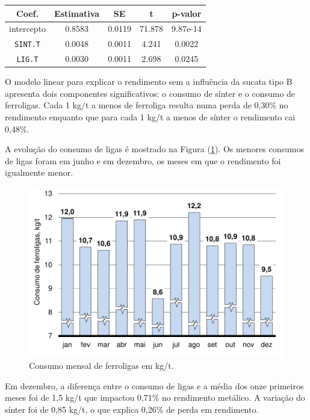 \begin{multicols}{2}
\begin{table}[H]
\begin{center}
\begin{small}
		\label{tab:newmod}
			\begin{tabular}{ccccc}
				\hline
				Coef. & Estimativa & SE & t & p-valor \\
				\hline \hline
				intercepto		&  0.8583 & 0.0119 &  71.878 & 9.87e-14 \\
				\texttt{SINT.T}	&  0.0048 & 0.0011 &   4.241 & 0.0022  \\
				\texttt{LIG.T}	&  0.0030 & 0.0011 &   2.698 & 0.0245  \\
				\hline
			\end{tabular}
			\end{small}
			\end{center}
	\end{table}						
	O modelo linear para explicar o rendimento sem a influência da sucata tipo B apresenta dois componentes significativos: o consumo de sínter e o consumo de ferroligas. Cada 1 kg/t a menos de ferroliga resulta numa perda de 0,30\% no rendimento enquanto que para cada
	1 kg/t a menos de sínter o rendimento cai 0,48\%.
	
	A evolução do consumo de ligas é mostrado na Figura (\ref{fig:ligas_mes}). Os menores consumos de ligas foram em junho e em dezembro, os meses em que o rendimento foi igualmente menor.
	\begin{figure}[H]
		\centering
		\includegraphics[scale=0.55, bb=0 0 432 288, trim=0in 0in 0in 0in]{figures/fig11-excel.pdf} %
		\caption{Consumo mensal de ferroligas em kg/t\cite{rel16}.}
		\label{fig:ligas_mes}
	\end{figure}			
	Em dezembro, a diferença entre o consumo de ligas e a média dos onze primeiros meses foi de 1,5 kg/t que impactou 0,71\% no rendimento metálico. A variação do sínter foi de 0,85 kg/t, o que explica 0,26\% de perda em rendimento.
	

\end{multicols}

